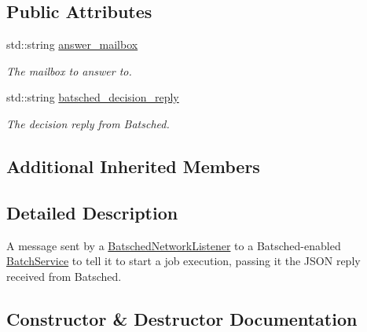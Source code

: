 \subsection*{Public Attributes}
\begin{DoxyCompactItemize}
\item 
\mbox{\label{classwrench_1_1_batch_execute_job_from_bat_sched_message_a52482536e42f7d63830eec2afa8e1e48}} 
std\+::string \hyperlink{classwrench_1_1_batch_execute_job_from_bat_sched_message_a52482536e42f7d63830eec2afa8e1e48}{answer\+\_\+mailbox}
\begin{DoxyCompactList}\small\item\em The mailbox to answer to. \end{DoxyCompactList}\item 
\mbox{\label{classwrench_1_1_batch_execute_job_from_bat_sched_message_a580ba37a834ee4e408f6e045314362e4}} 
std\+::string \hyperlink{classwrench_1_1_batch_execute_job_from_bat_sched_message_a580ba37a834ee4e408f6e045314362e4}{batsched\+\_\+decision\+\_\+reply}
\begin{DoxyCompactList}\small\item\em The decision reply from Batsched. \end{DoxyCompactList}\end{DoxyCompactItemize}
\subsection*{Additional Inherited Members}


\subsection{Detailed Description}
A message sent by a \hyperlink{classwrench_1_1_batsched_network_listener}{Batsched\+Network\+Listener} to a Batsched-\/enabled \hyperlink{classwrench_1_1_batch_service}{Batch\+Service} to tell it to start a job execution, passing it the J\+S\+ON reply received from Batsched. 

\subsection{Constructor \& Destructor Documentation}
\mbox{\label{classwrench_1_1_batch_execute_job_from_bat_sched_message_ac239c71112b1d05c5c2a5aabfcfb58b1}} 
